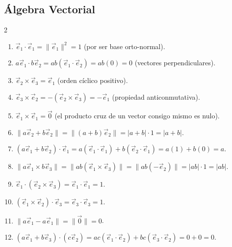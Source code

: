 \subsection{Álgebra Vectorial}

\begin{sol}
\begin{multicols}{2} 
\begin{enumerate}
    \item $\vec{e}_1 \cdot \vec{e}_1 = \|\vec{e}_1\|^2 = 1$ (por ser base orto-normal).
    \item $a\vec{e}_1 \cdot b\vec{e}_2 = ab(\vec{e}_1 \cdot \vec{e}_2) = ab(0) = 0$ (vectores perpendiculares).
    \item $\vec{e}_2 \times \vec{e}_3 = \vec{e}_1$ (orden cíclico positivo).
    \item $\vec{e}_3 \times \vec{e}_2 = -(\vec{e}_2 \times \vec{e}_3) = -\vec{e}_1$ (propiedad anticonmutativa).
    \item $\vec{e}_1 \times \vec{e}_1 = \vec{0}$ (el producto cruz de un vector consigo mismo es nulo).
    \item $\| a\vec{e}_2 + b\vec{e}_2 \| = \|(a+b)\vec{e}_2\| = |a+b| \cdot 1 = |a+b|$.
    \item $(a\vec{e}_1 + b\vec{e}_2) \cdot \vec{e}_1 = a(\vec{e}_1 \cdot \vec{e}_1) + b(\vec{e}_2 \cdot \vec{e}_1) = a(1) + b(0) = a$.
    \item $\| a\vec{e}_1 \times b\vec{e}_3 \| = \| ab(\vec{e}_1 \times \vec{e}_3) \| = \| ab(-\vec{e}_2) \| = |ab| \cdot 1 = |ab|$.
    \item $\vec{e}_1 \cdot (\vec{e}_2 \times \vec{e}_3) = \vec{e}_1 \cdot \vec{e}_1 = 1$.
    \item $(\vec{e}_1 \times \vec{e}_2) \cdot \vec{e}_3 = \vec{e}_3 \cdot \vec{e}_3 = 1$.
    \item $\| a\vec{e}_1 - a\vec{e}_1 \| = \| \vec{0} \| = 0$.
    \item $(a\vec{e}_1 + b\vec{e}_3) \cdot (c\vec{e}_2) = ac(\vec{e}_1 \cdot \vec{e}_2) + bc(\vec{e}_3 \cdot \vec{e}_2) = 0 + 0 = 0$.
\end{enumerate}
\end{multicols}
\end{sol}
